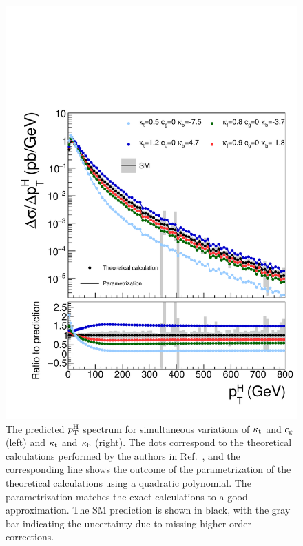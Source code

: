 \begin{figure}[hbtp]
\begin{center}
    \includegraphics[width=\halflinewidth]{img/interpretation/other/varparcomp_ktkb.pdf}
    \caption{
        The predicted $p_\mathrm{T}^\mathrm{H}$ spectrum for simultaneous variations of $\kappa_{\mathrm{t}}$ and $c_\mathrm{g}$ (left) and $\kappa_{\mathrm{t}}$ and $\kappa_{\mathrm{b}}$ (right).
        The dots correspond to the theoretical calculations performed by the authors in Ref.~\cite{Grazzini:2017szg}, and the corresponding line shows the outcome of the parametrization of the theoretical calculations using a quadratic polynomial.
        The parametrization matches the exact calculations to a good approximation.
        The SM prediction is shown in black, with the gray bar indicating the uncertainty due to missing higher order corrections.
        }
    \label{fig:theories_ktcgkb}
  \end{center}
\end{figure}


